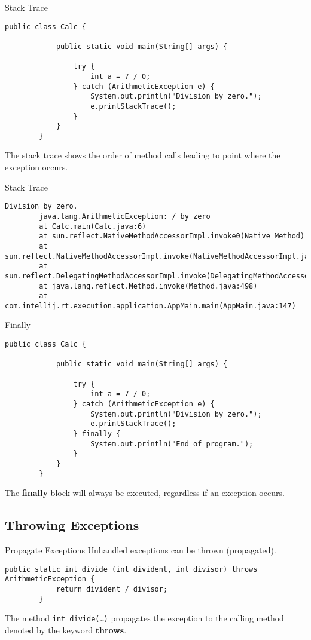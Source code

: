 \begin{frame}[fragile]{Stack Trace}
	\begin{lstlisting}[basicstyle=\ttfamily\scriptsize]
		public class Calc {
			
			public static void main(String[] args) {
				
				try {
					int a = 7 / 0;
				} catch (ArithmeticException e) {
					System.out.println("Division by zero.");
					e.printStackTrace();
				}
			}
		}
	\end{lstlisting}
	The stack trace shows the order of method calls leading to point where the exception occurs.
\end{frame}

\begin{frame}[fragile]{Stack Trace}
	\begin{lstlisting}[basicstyle=\ttfamily\scriptsize]
		Division by zero.
		java.lang.ArithmeticException: / by zero
		at Calc.main(Calc.java:6)
		at sun.reflect.NativeMethodAccessorImpl.invoke0(Native Method)
		at sun.reflect.NativeMethodAccessorImpl.invoke(NativeMethodAccessorImpl.java:62)
		at sun.reflect.DelegatingMethodAccessorImpl.invoke(DelegatingMethodAccessorImpl.java:43)
		at java.lang.reflect.Method.invoke(Method.java:498)
		at com.intellij.rt.execution.application.AppMain.main(AppMain.java:147)
	\end{lstlisting}
\end{frame}

\begin{frame}[fragile]{Finally}
	\begin{lstlisting}[basicstyle=\ttfamily\scriptsize]
		public class Calc {
			
			public static void main(String[] args) {
				
				try {
					int a = 7 / 0;
				} catch (ArithmeticException e) {
					System.out.println("Division by zero.");
					e.printStackTrace();
				} finally {
					System.out.println("End of program.");
				}
			}
		}
	\end{lstlisting}
	The \textbf{finally}-block will always be executed, regardless if an exception occurs.
\end{frame}

\subsection{Throwing Exceptions}
\begin{frame}[fragile]{Propagate Exceptions}
	Unhandled exceptions can be thrown (propagated).
	\begin{lstlisting}[basicstyle=\ttfamily\scriptsize]	
		public static int divide (int divident, int divisor) throws ArithmeticException {
			return divident / divisor;
		}
	\end{lstlisting}
	The method \texttt{int divide(\dots)} propagates the exception to the calling
	method denoted by the keyword \textbf{throws}.
\end{frame}

